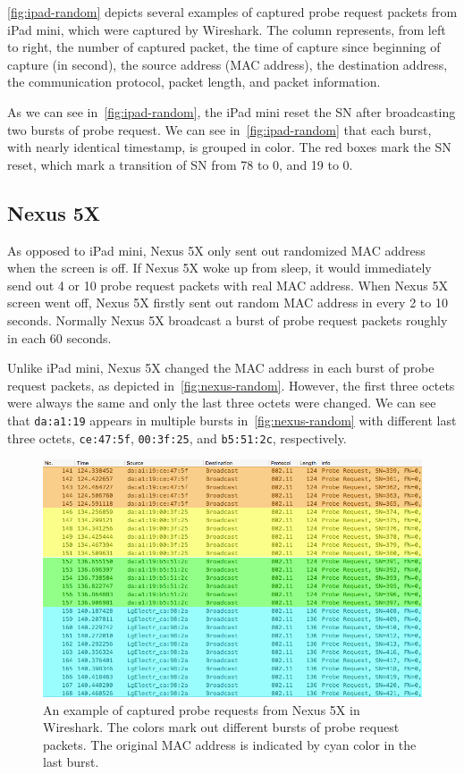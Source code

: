 	\autoref{fig:ipad-random} depicts several examples of captured probe request packets from iPad mini, which were captured by Wireshark. The column represents, from left to right, the number of captured packet, the time of capture since beginning of capture (in second), the source address (\ac{MAC} address), the destination address, the communication protocol, packet length, and packet information.
	
	As we can see in~\autoref{fig:ipad-random}, the iPad mini reset the \ac{SN} after broadcasting two bursts of probe request. We can see in~\autoref{fig:ipad-random} that each burst, with nearly identical timestamp, is grouped in color. The red boxes mark the \ac{SN} reset, which mark a transition of \ac{SN} from 78 to 0, and 19 to 0.


	\subsection{Nexus 5X} %
	\label{sub:lg_nexus_5x}
	As opposed to iPad mini, Nexus 5X only sent out randomized \ac{MAC} address when the screen is off. If Nexus 5X woke up from sleep, it would immediately send out 4 or 10 probe request packets with real \ac{MAC} address. When Nexus 5X screen went off, Nexus 5X firstly sent out random \ac{MAC} address in every 2 to 10 seconds. Normally Nexus 5X broadcast a burst of probe request packets roughly in each 60 seconds.

	Unlike iPad mini, Nexus 5X changed the \ac{MAC} address in each burst of probe request packets, as depicted in~\autoref{fig:nexus-random}. However, the first three octets were always the same and only the last three octets were changed. We can see that \verb|da:a1:19| appears in multiple bursts in~\autoref{fig:nexus-random} with different last three octets, \verb|ce:47:5f|, \verb|00:3f:25|, and \verb|b5:51:2c|, respectively.
	
	\begin{figure}[h]
		\centering
		\includegraphics[width=\textwidth]{./img/result/randomization/nexus-5x}
		\caption[An example of captured probe requests from Nexus 5X.]{An example of captured probe requests from Nexus 5X in Wireshark. The colors mark out different bursts of probe request packets. The original \ac{MAC} address is indicated by cyan color in the last burst.}
		\label{fig:nexus-random}
	\end{figure}	

